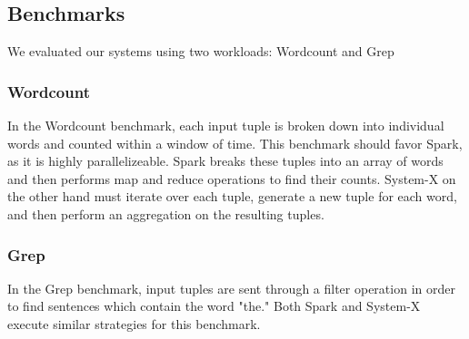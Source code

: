 
\subsection{Benchmarks}
We evaluated our systems using two workloads: Wordcount and Grep

\subsubsection{Wordcount}
In the Wordcount benchmark, each input tuple is broken down into individual words and counted within a window of time.  This benchmark should favor Spark, as it is highly parallelizeable.   Spark breaks these tuples into an array of words and then performs map and reduce operations to find their counts.  System-X on the other hand must iterate over each tuple, generate a new tuple for each word, and then perform an aggregation on the resulting tuples.


\subsubsection{Grep}
In the Grep benchmark, input tuples are sent through a filter operation in order to find sentences which contain the word "the."  Both Spark and System-X execute similar strategies for this benchmark.


